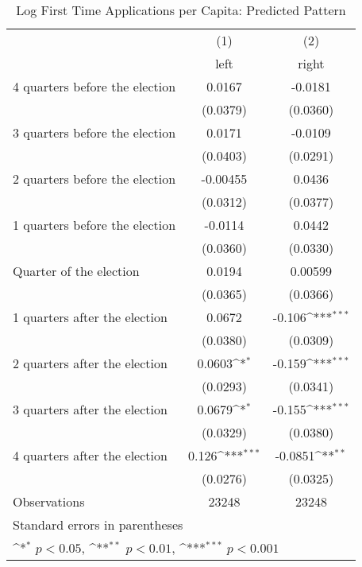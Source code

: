 \begin{table}[htbp]\centering
\def\sym#1{\ifmmode^{#1}\else\(^{#1}\)\fi}
\caption{Log First Time Applications per Capita: Predicted Pattern}
\begin{tabular}{l*{2}{c}}
\hline\hline
                    &\multicolumn{1}{c}{(1)}&\multicolumn{1}{c}{(2)}\\
                    &\multicolumn{1}{c}{left}&\multicolumn{1}{c}{right}\\
\hline
 4 quarters before the election&      0.0167         &     -0.0181         \\
                    &    (0.0379)         &    (0.0360)         \\
[1em]
 3 quarters before the election&      0.0171         &     -0.0109         \\
                    &    (0.0403)         &    (0.0291)         \\
[1em]
 2 quarters before the election&    -0.00455         &      0.0436         \\
                    &    (0.0312)         &    (0.0377)         \\
[1em]
 1 quarters before the election&     -0.0114         &      0.0442         \\
                    &    (0.0360)         &    (0.0330)         \\
[1em]
Quarter of the election&      0.0194         &     0.00599         \\
                    &    (0.0365)         &    (0.0366)         \\
[1em]
 1 quarters after the election&      0.0672         &      -0.106\sym{***}\\
                    &    (0.0380)         &    (0.0309)         \\
[1em]
 2 quarters after the election&      0.0603\sym{*}  &      -0.159\sym{***}\\
                    &    (0.0293)         &    (0.0341)         \\
[1em]
 3 quarters after the election&      0.0679\sym{*}  &      -0.155\sym{***}\\
                    &    (0.0329)         &    (0.0380)         \\
[1em]
 4 quarters after the election&       0.126\sym{***}&     -0.0851\sym{**} \\
                    &    (0.0276)         &    (0.0325)         \\
\hline
Observations        &       23248         &       23248         \\
\hline\hline
\multicolumn{3}{l}{\footnotesize Standard errors in parentheses}\\
\multicolumn{3}{l}{\footnotesize \sym{*} \(p<0.05\), \sym{**} \(p<0.01\), \sym{***} \(p<0.001\)}\\
\end{tabular}
\end{table}
